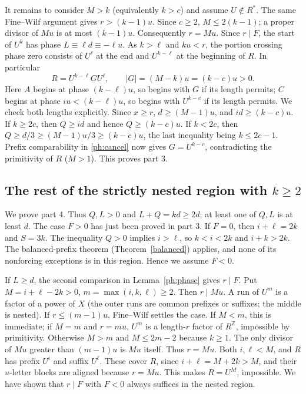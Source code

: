 \documentclass[11pt]{article}
\theoremstyle{remark}\newtheorem*{remark}{Remark}
\begin{document}
It remains to consider $M>k$ (equivalently $k>c$) and assume
$U\notin R^*$. The same Fine--Wilf argument gives $r>(k-1)u$.
Since $c\ge2$, $M\le2(k-1)$; a proper divisor of $Mu$ is at most
$(k-1)u$. Consequently $r=Mu$. Since $r\mid F$, the start of
$U^k$ has phase $L\equiv\ell d\equiv-\ell u$. As $k>\ell$ and
$ku<r$, the portion crossing phase zero consists of $U^\ell$ at the
end and $U^{k-\ell}$ at the beginning of $R$. In particular
\[
 R=U^{k-\ell}G U^\ell,
 \qquad |G|=(M-k)u=(k-c)u>0.
\]
Here $A$ begins at phase $(k-\ell)u$, so begins with $G$ if its
length permits; $C$ begins at phase $iu<(k-\ell)u$, so begins with
$U^{k-c}$ if its length permits. We check both lengths explicitly.
Since $x\ge r$, $d\ge(M-1)u$, and $id\ge(k-c)u$. If $k\ge2c$,
then $Q\ge id$ and hence $Q\ge(k-c)u$. If $k<2c$, then
$Q\ge d/3\ge(M-1)u/3\ge(k-c)u$, the last inequality being
$k\le2c-1$. Prefix comparability in \eqref{ph:cancel} now gives
$G=U^{k-c}$, contradicting the primitivity of $R$ ($M>1$).
This proves part 3.

\subsection{The rest of the strictly nested region with $k\ge2$}
We prove part 4. Thus $Q,L>0$ and $L+Q=kd\ge2d$; at least one of
$Q,L$ is at least $d$. The case $F>0$ has just been proved in part 3.
If $F=0$, then $i+\ell=2k$ and $S=3k$. The inequality $Q>0$ implies
$i>\ell$, so $k<i<2k$ and $i+k>2k$. The balanced-prefix theorem
(Theorem~\ref{balanced}) applies, and none of its nonforcing exceptions
is in this region. Hence we assume $F<0$.

If $L\ge d$, the second comparison in Lemma~\ref{ph:phase} gives
$r\mid F$. Put $M=i+\ell-2k>0$, $m=\max(i,k,\ell)\ge2$. Then
$r\mid Mu$. A run of $U^m$ is a factor of a power of $X$ (the outer
runs are common prefixes or suffixes; the middle is nested).
If $r\le(m-1)u$, Fine--Wilf settles the case. If $M<m$, this is
immediate; if $M=m$ and $r=mu$, $U^m$ is a length-$r$ factor of
$R^{\mathbb Z}$, impossible by primitivity. Otherwise $M>m$ and
$M\le2m-2$ because $k\ge1$. The only divisor of $Mu$ greater than
$(m-1)u$ is $Mu$ itself. Thus $r=Mu$. Both $i,\ell<M$, and $R$
has prefix $U^i$ and suffix $U^\ell$. These cover $R$, since
$i+\ell=M+2k>M$, and their $u$-letter blocks are aligned because
$r=Mu$. This makes $R=U^M$, impossible. We have shown that $r\mid F$
with $F<0$ always suffices in the nested region.
\end{document}

